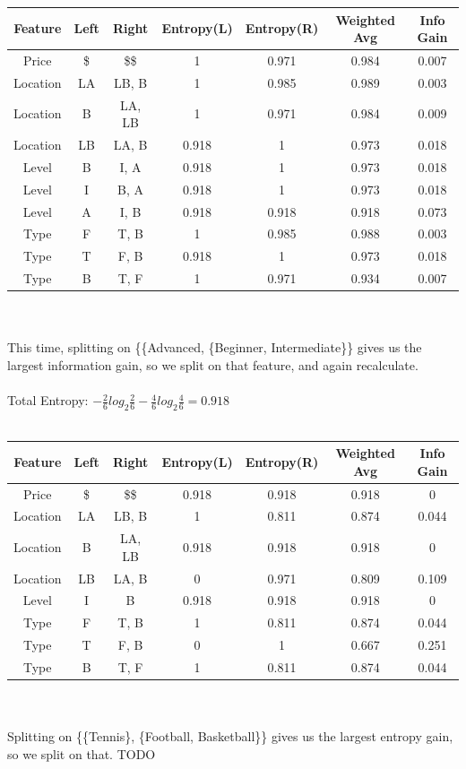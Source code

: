 \documentclass[12pt, letterpaper]{article}
\begin{document}
 \begin{tabular}{ |c|c|c|c|c|c|c| } 
 \hline
 \textbf{Feature} & \textbf{Left} & \textbf{Right}& \textbf{Entropy(L)}& \textbf{Entropy(R)}& \textbf{Weighted Avg}& \textbf{Info Gain} \\ 
\hline
Price & \$ & \$\$ & 1 & 0.971 & 0.984 & 0.007 \\ 
 \hline
Location & LA & LB, B & 1 & 0.985 & 0.989 & 0.003 \\ 
 \hline
Location & B & LA,  LB & 1 & 0.971 & 0.984 & 0.009 \\ 
 \hline
Location & LB & LA, B & 0.918 & 1 & 0.973 & 0.018 \\ 
 \hline
Level & B & I, A & 0.918 & 1 & 0.973 & 0.018 \\ 
 \hline
Level & I & B, A & 0.918 & 1 & 0.973 & 0.018 \\ 
 \hline
Level & A & I, B & 0.918 & 0.918 & 0.918 & 0.073 \\ 
 \hline
Type & F & T, B & 1 & 0.985 & 0.988 & 0.003 \\ 
 \hline
Type & T & F, B & 0.918 & 1 & 0.973 & 0.018 \\ 
 \hline
Type & B & T, F & 1 & 0.971 & 0.934 & 0.007 \\ 
 \hline
\end{tabular}\\\\
This time, splitting on \{\{Advanced, \{Beginner, Intermediate\}\} gives us the largest information gain, so we split on that feature, and again recalculate.\\\\
Total Entropy: $-\frac{2}{6}log_2\frac{2}{6}-\frac{4}{6}log_2\frac{4}{6}=0.918$\\\\
 \begin{tabular}{ |c|c|c|c|c|c|c| } 
 \hline
 \textbf{Feature} & \textbf{Left} & \textbf{Right}& \textbf{Entropy(L)}& \textbf{Entropy(R)}& \textbf{Weighted Avg}& \textbf{Info Gain} \\ 
\hline
Price & \$ & \$\$ & 0.918 & 0.918 & 0.918 & 0 \\ 
 \hline
Location & LA & LB, B & 1 & 0.811 & 0.874 & 0.044 \\ 
 \hline
Location & B & LA,  LB & 0.918 & 0.918 & 0.918 & 0 \\ 
 \hline
Location & LB & LA, B & 0 & 0.971 & 0.809 & 0.109 \\ 
 \hline
Level & I & B & 0.918 & 0.918 & 0.918 & 0 \\ 
 \hline
Type & F & T, B & 1 & 0.811 & 0.874 & 0.044 \\ 
 \hline
Type & T & F, B & 0 & 1 & 0.667 & 0.251 \\ 
 \hline
Type & B & T, F & 1 & 0.811 & 0.874 & 0.044 \\ 
 \hline
\end{tabular}\\\\
Splitting on \{\{Tennis\}, \{Football, Basketball\}\} gives us the largest entropy gain, so we split on that.
TODO
\end{document}
